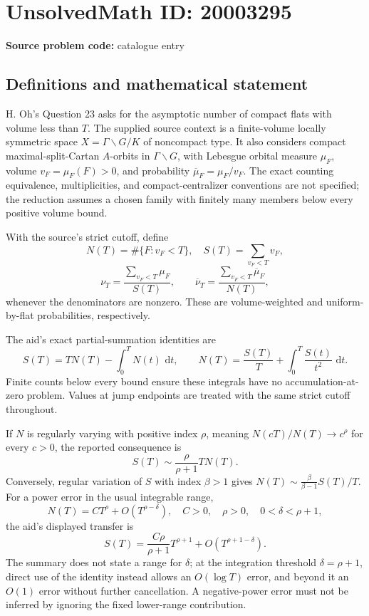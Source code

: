 \documentclass[11pt]{article}
\newcommand{\dd}{\,\mathrm{d}}
\begin{document}
\section*{UnsolvedMath ID: 20003295}
\textbf{Source problem code:} catalogue entry
\subsection{Definitions and mathematical statement}
H. Oh's Question 23 asks for the asymptotic number of compact flats with volume less than \(T\). The supplied source context is a finite-volume locally symmetric space \(X=\Gamma\backslash G/K\) of noncompact type. It also considers compact maximal-split-Cartan \(A\)-orbits in \(\Gamma\backslash G\), with Lebesgue orbital measure \(\mu_F\), volume \(v_F=\mu_F(F)>0\), and probability \(\overline\mu_F=\mu_F/v_F\). The exact counting equivalence, multiplicities, and compact-centralizer conventions are not specified; the reduction assumes a chosen family with finitely many members below every positive volume bound.

With the source's strict cutoff, define
\[
 N(T)=\#\{F:v_F<T\},\quad S(T)=\sum_{v_F<T}v_F,
\]
\[
 \nu_T=\frac{\sum_{v_F<T}\mu_F}{S(T)},\qquad
 \overline\nu_T=\frac{\sum_{v_F<T}\overline\mu_F}{N(T)},
\]
whenever the denominators are nonzero. These are volume-weighted and uniform-by-flat probabilities, respectively.

The aid's exact partial-summation identities are
\[
 S(T)=TN(T)-\int_0^T N(t)\,\dd t,
 \qquad
 N(T)=\frac{S(T)}T+\int_0^T\frac{S(t)}{t^2}\,\dd t.
\]
Finite counts below every bound ensure these integrals have no accumulation-at-zero problem. Values at jump endpoints are treated with the same strict cutoff throughout.

If \(N\) is regularly varying with positive index \(\rho\), meaning \(N(cT)/N(T)\to c^\rho\) for every \(c>0\), the reported consequence is
\[
 S(T)\sim\frac{\rho}{\rho+1}TN(T).
\]
Conversely, regular variation of \(S\) with index \(\beta>1\) gives \(N(T)\sim\frac{\beta}{\beta-1}S(T)/T\). For a power error in the usual integrable range,
\[
 N(T)=CT^\rho+O(T^{\rho-\delta}),\quad C>0,\quad\rho>0,\quad0<\delta<\rho+1,
\]
the aid's displayed transfer is
\[
 S(T)=\frac{C\rho}{\rho+1}T^{\rho+1}+O(T^{\rho+1-\delta}).
\]
The summary does not state a range for \(\delta\); at the integration threshold \(\delta=\rho+1\), direct use of the identity instead allows an \(O(\log T)\) error, and beyond it an \(O(1)\) error without further cancellation. A negative-power error must not be inferred by ignoring the fixed lower-range contribution.
\end{document}

